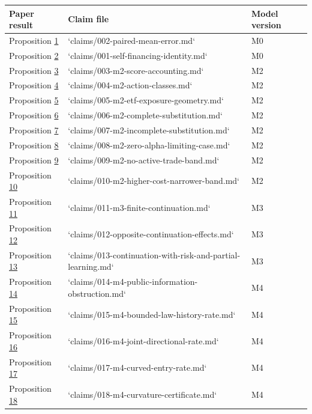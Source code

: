 \documentclass[11pt]{article}
\begin{document}
{\footnotesize
\begin{longtable}{lll}
\toprule
\textbf{Paper result} & \textbf{Claim file} & \textbf{Model version} \\
\midrule
\endhead
\bottomrule
\endlastfoot
Proposition \hyperref[res:Proposition-1]{1} & `claims/002-paired-mean-error.md` & M0 \\
Proposition \hyperref[res:Proposition-2]{2} & `claims/001-self-financing-identity.md` & M0 \\
Proposition \hyperref[res:Proposition-3]{3} & `claims/003-m2-score-accounting.md` & M2 \\
Proposition \hyperref[res:Proposition-4]{4} & `claims/004-m2-action-classes.md` & M2 \\
Proposition \hyperref[res:Proposition-5]{5} & `claims/005-m2-etf-exposure-geometry.md` & M2 \\
Proposition \hyperref[res:Proposition-6]{6} & `claims/006-m2-complete-substitution.md` & M2 \\
Proposition \hyperref[res:Proposition-7]{7} & `claims/007-m2-incomplete-substitution.md` & M2 \\
Proposition \hyperref[res:Proposition-8]{8} & `claims/008-m2-zero-alpha-limiting-case.md` & M2 \\
Proposition \hyperref[res:Proposition-9]{9} & `claims/009-m2-no-active-trade-band.md` & M2 \\
Proposition \hyperref[res:Proposition-10]{10} & `claims/010-m2-higher-cost-narrower-band.md` & M2 \\
Proposition \hyperref[res:Proposition-11]{11} & `claims/011-m3-finite-continuation.md` & M3 \\
Proposition \hyperref[res:Proposition-12]{12} & `claims/012-opposite-continuation-effects.md` & M3 \\
Proposition \hyperref[res:Proposition-13]{13} & `claims/013-continuation-with-risk-and-partial-learning.md` & M3 \\
Proposition \hyperref[res:Proposition-14]{14} & `claims/014-m4-public-information-obstruction.md` & M4 \\
Proposition \hyperref[res:Proposition-15]{15} & `claims/015-m4-bounded-law-history-rate.md` & M4 \\
Proposition \hyperref[res:Proposition-16]{16} & `claims/016-m4-joint-directional-rate.md` & M4 \\
Proposition \hyperref[res:Proposition-17]{17} & `claims/017-m4-curved-entry-rate.md` & M4 \\
Proposition \hyperref[res:Proposition-18]{18} & `claims/018-m4-curvature-certificate.md` & M4 \\

\end{longtable}}
\end{document}

